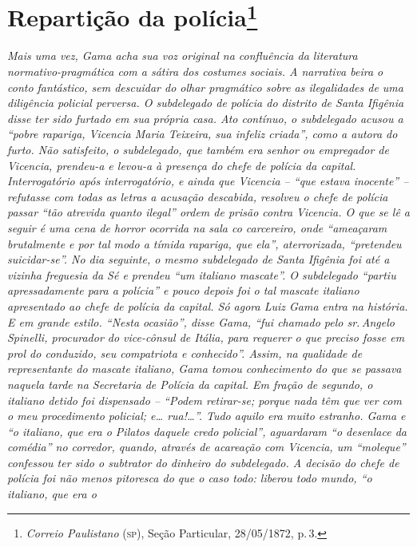 \chapter{Repartição da polícia\footnote{\emph{Correio Paulistano} (\textsc{sp}), Seção Particular,
  28/05/1872, p.\,3.}} %

\begin{didascalia}
\emph{Mais uma vez, Gama acha sua voz original na confluência da
literatura normativo-pragmática com a sátira dos costumes sociais. A
narrativa beira o conto fantástico, sem descuidar do olhar pragmático
sobre as ilegalidades de uma diligência policial perversa. O subdelegado
de polícia do distrito de Santa Ifigênia disse ter sido furtado em sua
própria casa. Ato contínuo, o subdelegado acusou a ``pobre rapariga,
Vicencia Maria Teixeira, sua infeliz criada'', como a autora do furto.
Não satisfeito, o subdelegado, que também era senhor ou empregador de
Vicencia, prendeu-a e levou-a à presença do chefe de polícia da capital.
Interrogatório após interrogatório, e ainda que Vicencia -- ``que estava
inocente'' -- refutasse com todas as letras a acusação descabida,
resolveu o chefe de polícia passar ``tão atrevida quanto ilegal'' ordem de
prisão contra Vicencia. O que se lê a seguir é uma cena de horror
ocorrida na sala co carcereiro, onde ``ameaçaram brutalmente e por tal
modo a tímida rapariga, que ela'', aterrorizada, ``pretendeu suicidar-se''.
No dia seguinte, o mesmo subdelegado de Santa Ifigênia foi até a vizinha
freguesia da Sé e prendeu ``um italiano mascate''. O subdelegado ``partiu
apressadamente para a polícia'' e pouco depois foi o tal mascate italiano
apresentado ao chefe de polícia da capital. Só agora Luiz Gama entra na
história. E em grande estilo. ``Nesta ocasião'', disse Gama, ``fui chamado
pelo sr.\,Angelo Spinelli, procurador do vice-cônsul de Itália, para
requerer o que preciso fosse em prol do conduzido, seu compatriota e
conhecido''. Assim, na qualidade de representante do mascate italiano,
Gama tomou conhecimento do que se passava naquela tarde na Secretaria de
Polícia da capital. Em fração de segundo, o italiano detido foi
dispensado -- ``Podem retirar-se; porque nada têm que ver com o meu
procedimento policial; e\ldots{} rua!\ldots{}''. Tudo aquilo era muito estranho.
Gama e ``o italiano, que era o Pilatos daquele credo policial'',
aguardaram ``o desenlace da comédia'' no corredor, quando, através de
acareação com Vicencia, um ``moleque'' confessou ter sido o subtrator do
dinheiro do subdelegado. A decisão do chefe de polícia foi não menos
pitoresca do que o caso todo: liberou todo mundo, ``o italiano, que era o
}
\end{didascalia}
